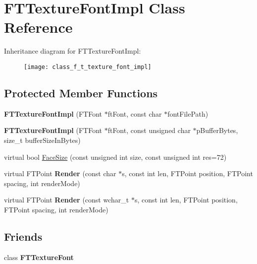 \hypertarget{class_f_t_texture_font_impl}{
\section{FTTextureFontImpl Class Reference}
\label{class_f_t_texture_font_impl}
}
Inheritance diagram for FTTextureFontImpl:\begin{figure}[H]
\begin{center}
\leavevmode
\texttt{[image: class\_f\_t\_texture\_font\_impl]}
\end{center}
\end{figure}
\subsection*{Protected Member Functions}
\begin{DoxyCompactItemize}
\item 
\hypertarget{class_f_t_texture_font_impl_a6e5537e5ce6f58e8f8244c9d0cd44d9f}{
{\bfseries FTTextureFontImpl} (FTFont $\ast$ftFont, const char $\ast$fontFilePath)}
\label{class_f_t_texture_font_impl_a6e5537e5ce6f58e8f8244c9d0cd44d9f}

\item 
\hypertarget{class_f_t_texture_font_impl_a4554181466170efa12b9a12e4936b61d}{
{\bfseries FTTextureFontImpl} (FTFont $\ast$ftFont, const unsigned char $\ast$pBufferBytes, size\_\-t bufferSizeInBytes)}
\label{class_f_t_texture_font_impl_a4554181466170efa12b9a12e4936b61d}

\item 
virtual bool \hyperlink{class_f_t_texture_font_impl_ac5ccaca6cc8a53292b5028a629e49244}{FaceSize} (const unsigned int size, const unsigned int res=72)
\item 
\hypertarget{class_f_t_texture_font_impl_a8b53cbe2b70ad38af59a7d79945122d9}{
virtual FTPoint {\bfseries Render} (const char $\ast$s, const int len, FTPoint position, FTPoint spacing, int renderMode)}
\label{class_f_t_texture_font_impl_a8b53cbe2b70ad38af59a7d79945122d9}

\item 
\hypertarget{class_f_t_texture_font_impl_aba852ac4cc9b759073b6370e059e6c11}{
virtual FTPoint {\bfseries Render} (const wchar\_\-t $\ast$s, const int len, FTPoint position, FTPoint spacing, int renderMode)}
\label{class_f_t_texture_font_impl_aba852ac4cc9b759073b6370e059e6c11}

\end{DoxyCompactItemize}
\subsection*{Friends}
\begin{DoxyCompactItemize}
\item 
\hypertarget{class_f_t_texture_font_impl_a7870c341f7269dfae257e93406c17c92}{
class {\bfseries FTTextureFont}}
\label{class_f_t_texture_font_impl_a7870c341f7269dfae257e93406c17c92}

\end{DoxyCompactItemize}


